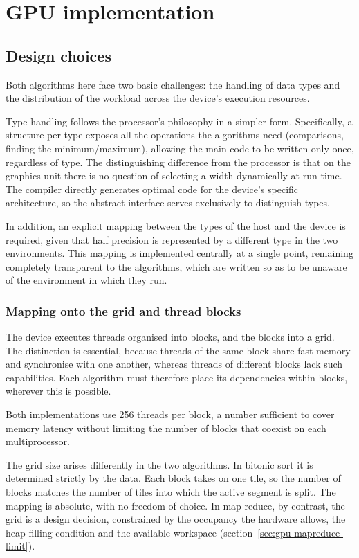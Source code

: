\chapter{GPU implementation}
\label{ch:gpu}

\section{Design choices}
\label{sec:gpu-design}

Both algorithms here face two basic challenges: the handling of data types and
the distribution of the workload across the device's execution resources.

Type handling follows the processor's philosophy in a simpler form.
Specifically, a structure per type exposes all the operations the algorithms
need (comparisons, finding the minimum/maximum), allowing the main code to be
written only once, regardless of type. The distinguishing difference from the
processor is that on the graphics unit there is no question of selecting a
width dynamically at run time. The compiler directly generates optimal code for
the device's specific architecture, so the abstract interface serves
exclusively to distinguish types.

In addition, an explicit mapping between the types of the host and the device
is required, given that half precision is represented by a different type in
the two environments. This mapping is implemented centrally at a single point,
remaining completely transparent to the algorithms, which are written so as to
be unaware of the environment in which they run.

\subsection{Mapping onto the grid and thread blocks}
\label{sec:gpu-mapping}

The device executes threads organised into blocks, and the blocks into a grid.
The distinction is essential, because threads of the same block share fast
memory and synchronise with one another, whereas threads of different blocks
lack such capabilities. Each algorithm must therefore place its dependencies
within blocks, wherever this is possible.

Both implementations use 256 threads per block, a number sufficient to cover
memory latency without limiting the number of blocks that coexist on each
multiprocessor.

The grid size arises differently in the two algorithms. In bitonic sort it is
determined strictly by the data. Each block takes on one tile, so the number of
blocks matches the number of tiles into which the active segment is split. The
mapping is absolute, with no freedom of choice. In map-reduce, by contrast, the
grid is a design decision, constrained by the occupancy the hardware allows,
the heap-filling condition and the available workspace
(section~\ref{sec:gpu-mapreduce-limit}).

